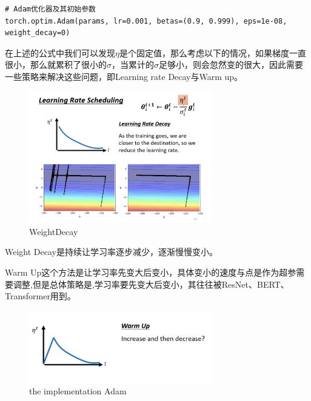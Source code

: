 \documentclass{article}
\begin{document}
\begin{lstlisting}
# Adam优化器及其初始参数
torch.optim.Adam(params, lr=0.001, betas=(0.9, 0.999), eps=1e-08, weight_decay=0)
\end{lstlisting}
\indent 在上述的公式中我们可以发现\(\eta\)是个固定值，那么考虑以下的情况，如果梯度一直很小，那么就累积了很小的\(\sigma\)，当累计的\(\sigma\)足够小，则会忽然变的很大，因此需要一些策略来解决这些问题，即Learning rate Decay与Warm up。\par
\begin{figure}[H]
    \centering
    \includegraphics[width=8cm]{picture/WeightDecay.png}
    \caption{WeightDecay}
    \label{fig:galxy}
\end{figure}
\indent Weight Decay是持续让学习率逐步减少，逐渐慢慢变小。\par
\indent Warm Up这个方法是让学习率先变大后变小，具体变小的速度与点是作为超参需要调整,但是总体策略是,学习率要先变大后变小，其往往被ResNet、BERT、Transformer用到。
\begin{figure}[H]
    \centering
    \includegraphics[width=8cm]{picture/Warm-up.png}
    \caption{the implementation Adam}
    \label{fig:galxy}
\end{figure}
\newpage

\end{document}
